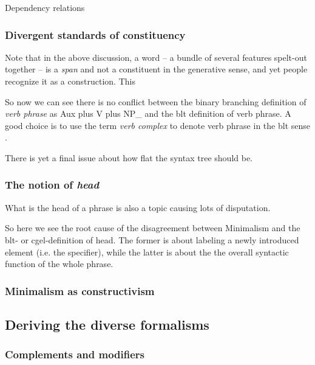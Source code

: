 \documentclass[../main.tex]{subfiles}
\begin{document}
Dependency relations

\subsubsection{Divergent standards of constituency}

Note that in the above discussion, a word -- a bundle of several features spelt-out together -- is a \emph{span}
and not a constituent in the generative sense, and yet people recognize it as a construction. This %

So now we can see there is no conflict between the binary branching definition of \emph{verb phrase} as Aux plus V plus NP_{} and the \ac{blt} definition of verb phrase. A good choice is to use the term 
\emph{verb complex} to denote verb phrase in the \ac{blt} sense \citep{Wilbur2014}.

There is yet a final issue about how flat the syntax tree should be. %

\subsubsection{The notion of \emph{head}}\label{sec:headedness}

What is the head of a phrase is also a topic causing lots of disputation. 

So here we see the root cause of the disagreement between Minimalism and the \ac{blt}- or \ac{cgel}-definition 
of head. The former is about labeling a newly introduced element (i.e. the specifier), while the latter is about 
the the overall syntactic function of the whole phrase. 

\subsubsection{Minimalism as constructivism}

\subsection{Deriving the diverse formalisms}


\subsubsection{Complements and modifiers}
\end{document}
